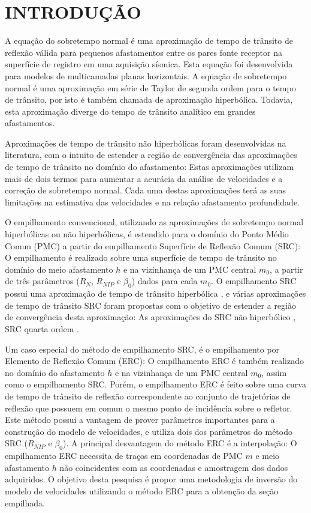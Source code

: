 \chapter{INTRODUÇÃO}
\label{intro}

A equação do sobretempo normal \cite{dix} é uma aproximação de tempo de trânsito de reflexão válida para pequenos afastamentos
entre os pares fonte receptor na superfície de registro em uma aquisição sísmica. Esta equação foi desenvolvida para modelos de
multicamadas planas horizontais. 
A equação de sobretempo normal é uma aproximação em série de Taylor de segunda ordem para o tempo de trânsito, por isto é
também chamada de aproximação hiperbólica. Todavia, esta aproximação diverge do tempo de trânsito analítico
em grandes afastamentos.

Aproximações de tempo de trânsito não hiperbólicas foram desenvolvidas na literatura,
com o intuito de estender a região de convergência das
aproximações de tempo de trânsito no domínio do afastamento: Estas aproximações utilizam mais de dois termos para aumentar a 
acurácia da análise de velocidades e a correção de sobretempo normal. Cada uma destas aproximações terá
as suas limitações na estimativa das velocidades e na relação afastamento profundidade.

O empilhamento convencional, utilizando as aproximações de sobretempo normal hiperbólicas ou não hiperbólicas, é estendido
para o domínio do Ponto Médio Comun (PMC) a partir do empilhamento Superfície de Reflexão Comum (SRC): 
O empilhamento é realizado sobre uma superfície de tempo de
trânsito no domínio do meio afastamento $h$ e na vizinhança de um PMC central $m_0$, a partir de
três parâmetros ($R_N$, $R_{NIP}$ e $\beta_0$) dados para cada $m_0$.
O empilhamento SRC possui uma aproximação de tempo de trânsito hiperbólica \cite{jager}, e várias aproximações
de tempo de trânsito SRC foram propostas com o objetivo de estender a região de convergência desta aproximação:
As aproximações do SRC não hiperbólico \cite{fomel1}, SRC quarta ordem
\cite{germam}.

Um caso especial do método de empilhamento SRC, é o empilhamento por Elemento de Reflexão Comum (ERC):
O empilhamento ERC é também realizado no domínio do afastamento $h$ e na vizinhança de um PMC central $m_0$, assim como o
empilhamento SRC. Porém, o empilhamento ERC é feito sobre uma curva de tempo de trânsito de reflexão correspondente ao
conjunto de trajetórias de reflexão que possuem em comun
o mesmo ponto de incidência sobre o refletor.
Este método possui a vantagem de prover
parâmetros importantes para a construção do modelo de velocidades, e utiliza dois dos parâmetros
do método SRC ($R_{NIP}$ e $\beta_0$).
A principal desvantagem do método ERC é a interpolação: O empilhamento ERC necessita de 
traços em coordenadas de PMC $m$ e meio afastamento $h$ não coincidentes com as coordenadas
e amostragem dos dados adquiridos.
O objetivo desta pesquisa é propor uma metodologia de inversão do modelo de velocidades utilizando o método ERC para
a obtenção da seção empilhada. 

